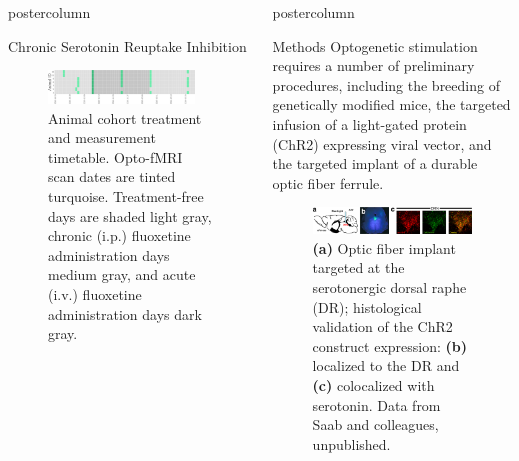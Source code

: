 \documentclass{beamer}
\newlength{\columnheight}
\begin{document}
\begin{frame}
\begin{columns}
\begin{column}{.43\textwidth}
\begin{beamercolorbox}[center]{postercolumn}
\begin{minipage}{.98\textwidth}
{\begin{myblock}{Chronic Serotonin Reuptake Inhibition}
\begin{itemize}
						\end{itemize}
						\vspace{0.5em}
						\begin{figure}
							\begin{minipage}{0.94\textwidth}
								\centering\includegraphics[width=0.9\textwidth]{img/tt.png}
								\caption{Animal cohort treatment and measurement timetable. Opto-fMRI scan dates are tinted turquoise. Treatment-free days are shaded light gray, chronic (i.p.) fluoxetine administration days medium gray, and acute (i.v.) fluoxetine administration days dark gray.}
								\label{fig:tt}
							\end{minipage}
						\end{figure}
					\end{myblock}\vfill
		}\end{minipage}\end{beamercolorbox}
	\end{column}
	\begin{column}{.57\textwidth}
		\begin{beamercolorbox}[center]{postercolumn}
			\begin{minipage}{.98\textwidth} %
				\parbox[t][\columnheight]{\textwidth}{ %
					\begin{myblock}{Methods}
						Optogenetic stimulation requires a number of preliminary procedures, including the breeding of genetically modified mice, the targeted infusion of a light-gated protein (ChR2) expressing viral vector, and the targeted implant of a durable optic fiber ferrule.
						\vspace{0.2em}
						\begin{figure}
							\begin{minipage}{.94\textwidth}
								\centering\includegraphics[width=\textwidth]{img/og.png}
								\caption{\textbf{(a)} Optic fiber implant targeted at the serotonergic dorsal raphe (DR); histological validation of the ChR2 construct expression: \textbf{(b)} localized to the DR  and \textbf{(c)} colocalized with serotonin. Data from Saab and colleagues, unpublished.}

\end{minipage}
\end{figure}
\end{myblock}}
\end{minipage}
\end{beamercolorbox}
\end{column}
\end{columns}
\end{frame}
\end{document}
